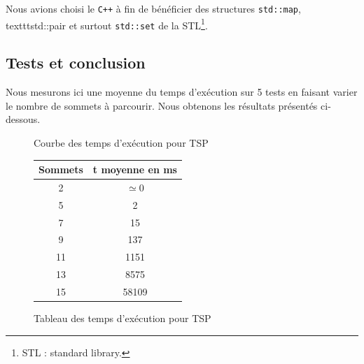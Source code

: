 Nous avions choisi le \texttt{C++} à fin de bénéficier des structures \texttt{std::map}, texttt{std::pair} et surtout \texttt{std::set} de la STL\footnote{STL : standard library.}. 

\vspace{0.5cm}

 

\subsection{Tests et conclusion}
Nous mesurons ici une moyenne du temps d'exécution sur 5 tests en
faisant varier le nombre de sommets à parcourir. Nous obtenons les
résultats présentés ci-dessous.

\begin{figure}[ht]
\begin{minipage}[b]{0.5\linewidth}
\centering
{}
\caption {Courbe des temps d'exécution pour TSP}
\end{minipage}
\hspace{0.5cm}
\begin{minipage}[b]{0.5\linewidth}
\centering
\begin{tabular}{|c|c|}
\hline
Sommets & t moyenne en ms\\
\hline
2 & $\simeq 0$\\
\hline
5 & 2\\
\hline
7 & 15\\
\hline
9 & 137\\
\hline
11 & 1151\\
\hline
13 & 8575\\
\hline
15 & 58109\\
\hline
\end{tabular}
\caption {Tableau des temps d'exécution pour TSP}
\end{minipage}
\end{figure}
